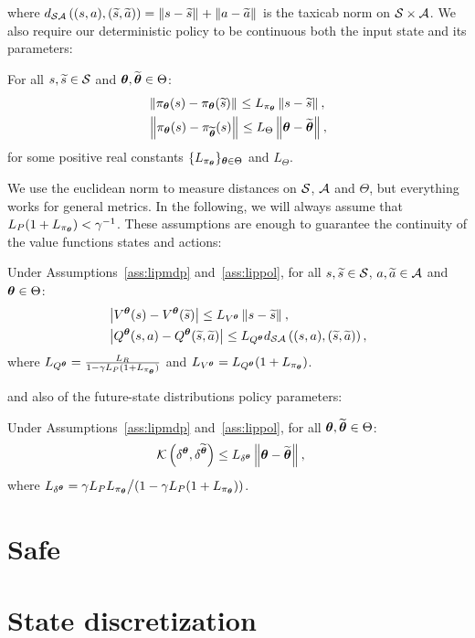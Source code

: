 %
\noindent where $d_{\mathcal{S}\mathcal{A}}\left((s,a),(\widetilde{s},\widetilde{a})\right) = \left\|s-\widetilde{s}\right\|_{} + \left\|a-\widetilde{a}\right\|_{}$ is the taxicab norm on $\mathcal{S}\times\mathcal{A}$.
We also require our deterministic policy to be continuous both \wrt the input state and its parameters:
%
\begin{assumption}\label{ass:lippol}
	For all $s,\widetilde{s}\in\mathcal{S}$ and $\boldsymbol{\theta},\widetilde{\boldsymbol{\theta}}\in\Theta$:
	\begin{align}
	&\left\|\pi_{\boldsymbol{\theta}}(s) - \pi_{\boldsymbol{\theta}}(\widetilde{s})\right\|_{} \leq L_{\pi_{\boldsymbol{\theta}}}\left\|s-\widetilde{s}\right\|_{}, \\
	&\left\|\pi_{\boldsymbol{\theta}}(s) - \pi_{\widetilde{\boldsymbol{\theta}}}(s)\right\|_{} \leq L_{\Theta}\left\|\boldsymbol{\theta}-\widetilde{\boldsymbol{\theta}}\right\|_{},
	\end{align}
	for some positive real constants $\{L_{\pi_{\boldsymbol{\theta}}}\}_{\boldsymbol{\theta}\in\Theta}$ and $L_{\Theta}$.
\end{assumption}
%
\noindent We use the euclidean norm to measure distances on $\mathcal{S}$, $\mathcal{A}$ and $\Theta$, but everything works for general metrics.
In the following, we will always assume that ${L_{P}(1+L_{\pi_{\boldsymbol{\theta}}}) < \gamma^{-1}}$.
These assumptions are enough to guarantee the continuity of the value functions \wrt states and actions:
%
\begin{lemma}\label{lem:lipval}
	Under Assumptions~\ref{ass:lipmdp} and~\ref{ass:lippol}, for all $s,\widetilde{s}\in\mathcal{S}$, $a,\widetilde{a}\in\mathcal{A}$ and $\boldsymbol{\theta}\in\Theta$:
	\begin{align}
	&\left|V^{\boldsymbol{\theta}}(s) - V^{\boldsymbol{\theta}}(\widetilde{s})\right| \leq L_{V^{\boldsymbol{\theta}}}\left\|s-\widetilde{s}\right\|_{}, \\
	&\left|Q^{\boldsymbol{\theta}}(s,a) - Q^{\boldsymbol{\theta}}(\widetilde{s},\widetilde{a})\right| \leq L_{Q^{\boldsymbol{\theta}}}d_{\mathcal{S}\mathcal{A}}\left((s,a),(\widetilde{s},\widetilde{a})\right),
	\end{align}
	where $L_{Q^{\boldsymbol{\theta}}} = \frac{L_{R}}{1-\gamma L_{P}(1+L_{\pi_{\boldsymbol{\theta}}})}$ and $L_{V^{\boldsymbol{\theta}}} = L_{Q^{\boldsymbol{\theta}}}(1+L_{\pi_{\boldsymbol{\theta}}})$.
\end{lemma}
%
\noindent and also of the future-state distributions \wrt policy parameters:
%
\begin{lemma}\label{lem:lipfut}
	Under Assumptions~\ref{ass:lipmdp} and~\ref{ass:lippol}, for all $\boldsymbol{\theta},\widetilde{\boldsymbol{\theta}}\in\Theta$:
	\begin{align}
	&\mathcal{K}\left(\delta^{\boldsymbol{\theta}},\delta^{\widetilde{\boldsymbol{\theta}}}\right) \leq L_{\delta^{\boldsymbol{\theta}}}\left\|\boldsymbol{\theta}-\widetilde{\boldsymbol{\theta}}\right\|_{},
	\end{align}
	where $L_{\delta^{\boldsymbol{\theta}}} = {\gamma L_{P}L_{\pi_{\boldsymbol{\theta}}}}\big/{\left(1-\gamma L_{P}(1+L_{\pi_{\boldsymbol{\theta}}})\right)}$.
\end{lemma}

\section{Safe }\label{sec:saferl}

\section{State discretization} \label{sec:stdisc}